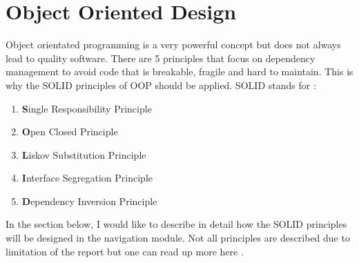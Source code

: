\section{Object Oriented Design}
    Object orientated programming is a very powerful concept but does not always lead to quality
    software. There are 5 principles that focus on dependency management to avoid code that
    is breakable, fragile and hard to maintain. This is why the SOLID \cite{Hotop2015} 
    principles of OOP should be applied.
    SOLID stands for :
    \begin{enumerate}
        \item 
            \textbf{S}ingle Responsibility Principle
        \item 
            \textbf{O}pen Closed Principle
        \item 
            \textbf{L}iskov Substitution Principle
        \item 
            \textbf{I}nterface Segregation Principle
        \item 
            \textbf{D}ependency Inversion Principle
    \end{enumerate}
    In the section below, I would like to describe in detail how the SOLID principles will 
    be designed in the navigation module. Not all principles are described due to
    limitation of the report but one can read up more here \cite{Hotop2015}.

    
    
    